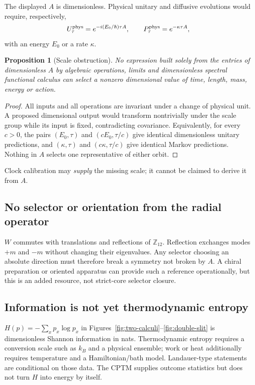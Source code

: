 \documentclass[11pt,a4paper]{article}
\newtheorem{proposition}[theorem]{Proposition}
\theoremstyle{definition}
\theoremstyle{remark}
\newcommand{\Z}{\mathbb Z}
\begin{document}
The displayed $A$ is dimensionless. Physical unitary and diffusive evolutions would require, respectively,
\[
 U_{\tau}^{\rm phys}=e^{-i(E_0/\hbar)\tau A},\qquad
 P_{\tau}^{\rm phys}=e^{-\kappa\tau A},
\]
with an energy $E_0$ or a rate $\kappa$.

\begin{proposition}[Scale obstruction]
No expression built solely from the entries of dimensionless $A$ by algebraic operations, limits and dimensionless spectral functional calculus can select a nonzero dimensional value of time, length, mass, energy or action.
\end{proposition}

\begin{proof}
All inputs and all operations are invariant under a change of physical unit. A proposed dimensional output would transform nontrivially under the scale group while its input is fixed, contradicting covariance. Equivalently, for every $c>0$, the pairs $(E_0,\tau)$ and $(cE_0,\tau/c)$ give identical dimensionless unitary predictions, and $(\kappa,\tau)$ and $(c\kappa,\tau/c)$ give identical Markov predictions. Nothing in $A$ selects one representative of either orbit.
\end{proof}

Clock calibration may \emph{supply} the missing scale; it cannot be claimed to derive it from $A$.

\subsection{No selector or orientation from the radial operator}

$W$ commutes with translations and reflections of $\Z_{12}$. Reflection exchanges modes $+m$ and $-m$ without changing their eigenvalues. Any selector choosing an absolute direction must therefore break a symmetry not broken by $A$. A chiral preparation or oriented apparatus can provide such a reference operationally, but this is an added resource, not strict-core selector closure.

\subsection{Information is not yet thermodynamic entropy}

$H(p)=-\sum_xp_x\log p_x$ in Figures~\ref{fig:two-calculi}--\ref{fig:double-slit} is dimensionless Shannon information in nats. Thermodynamic entropy requires a conversion scale such as $k_B$ and a physical ensemble; work or heat additionally requires temperature and a Hamiltonian/bath model. Landauer-type statements are conditional on those data. The CPTM supplies outcome statistics but does not turn $H$ into energy by itself.
\end{document}
